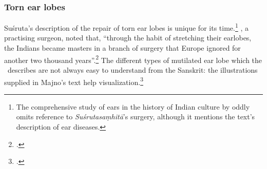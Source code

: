 %



\subsubsection{Torn ear lobes}

Suśruta's description of the repair of torn ear lobes is  unique for
its time.\footnote{The comprehensive study of ears in the history of Indian culture 
by \citet{boll-2010} oddly omits reference to \emph{Suśrutasaṃhitā}'s surgery, 
although it mentions the text's description of ear diseases.}  
\citeauthor{majn-1975}, a practising surgeon, noted that, “through the habit of
stretching their earlobes, the Indians became masters in a branch of surgery
that Europe ignored for another two thousand years”.\footcite[291]{majn-1975}  
The different types of
mutilated ear lobe which the \SS\ describes are not always easy to understand
from the Sanskrit: the illustrations supplied in Majno's text help
visualization.\footcites[290--291]{majn-1975}[reproduced with permission 
in][92--93]{wuja-2003}

